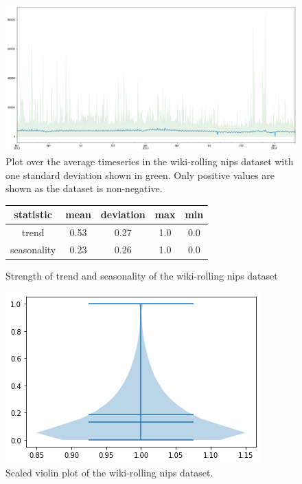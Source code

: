\begin{figure}[htb]
    \centering
    \includegraphics[width=\linewidth]{./img/wiki-rolling_nips_plot.png}
    \caption{Plot over the average timeseries in the wiki-rolling nips dataset with one standard deviation shown in green. Only positive values are shown as the dataset is non-negative.}
    \label{fig:wiki-rolling_nips_plot}
    \endminipage\hfill
\end{figure}

\begin{figure}[htb]
    \centering
    \begin{center}
        \begin{tabular}{||c | c | c | c | c |}
            \hline
            statistic   & mean & deviation & max & min \\
            \hline
            trend       & 0.53 & 0.27      & 1.0 & 0.0 \\
            \hline
            seasonality & 0.23 & 0.26      & 1.0 & 0.0 \\
            \hline
            \hline
        \end{tabular}
        \caption{Strength of trend and seasonality of the wiki-rolling nips dataset}
    \end{center}
    \endminipage\hfill
    \includegraphics[width=\linewidth]{./img/wiki-rolling_nips_violin.png}
    \caption{Scaled violin plot of the wiki-rolling nips dataset.}
    \label{fig:wiki-rolling_nips_violin}
    \endminipage\hfill
\end{figure}


